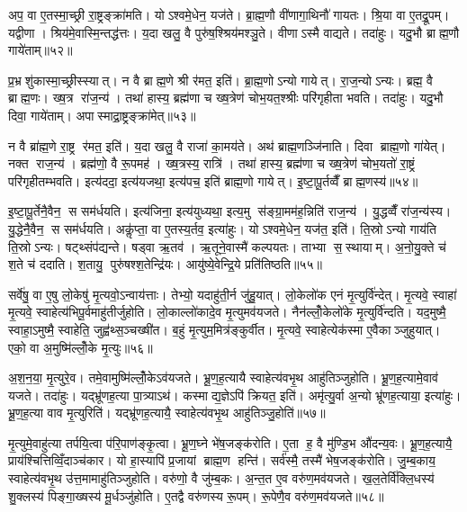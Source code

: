 अप॒ वा ए॒तस्मा॒च्छ्री रा॒ष्ट्रङ्क्रा॑मति। योऽश्वमे॒धेन॒ यज॑ते। ब्रा॒ह्म॒णौ वी॑णागा॒थिनौ॑ गायतः। श्रि॒या वा ए॒तद्रू॒पम्। यद्वीणा। श्रिय॑मे॒वास्मि॒न्तद्ध॑त्तः। य॒दा खलु॒ वै पुरु॑ष॒श्श्रिय॑मश्ञु॒ते। वीणाऽस्मै वाद्यते। तदा॑हुः। यदु॒भौ ब्राह्म॒णौ गाये॑ताम्॥५२॥

प्र॒भ्रशु॑कास्मा॒च्छ्रीस्स्यात्। न वै ब्राह्म॒णे श्री र॑मत॒ इति॑। ब्रा॒ह्म॒णोऽन्यो गायेत्। रा॒ज॒न्योऽन्यः। ब्रह्म॒ वै ब्राह्म॒णः। ख्ष॒त्र रा॑ज॒न्य॑। तथा॑ हास्य॒ ब्रह्म॑णा च ख्ष॒त्रेण॑ चोभ॒यत॒श्श्रीः परि॑गृहीता भवति। तदा॑हुः। यदु॒भौ दिवा॒ गाये॑ताम्। अपास्माद्रा॒ष्ट्रङ्क्रा॑मेत्॥५३॥

न वै ब्रा॑ह्म॒णे रा॒ष्ट्र र॑मत॒ इति॑। य॒दा खलु॒ वै राजा॑ का॒मय॑ते। अथ॑ ब्राह्म॒णञ्जि॑नाति। दिवा ब्राह्म॒णो गा॑येत्। नक्त राज॒न्य॑। ब्रह्म॑णो॒ वै रू॒पमह॑। ख्ष॒त्रस्य॒ रात्रि॑। तथा॑ हास्य॒ ब्रह्म॑णा च ख्ष॒त्रेण॑ चोभ॒यतो॑ रा॒ष्ट्रं परि॑गृहीतम्भवति। इत्य॑ददा॒ इत्य॑यजथा॒ इत्य॑पच॒ इति॑ ब्राह्म॒णो गायेत्। इ॒ष्टा॒पू॒र्तव्वैँ ब्राह्म॒णस्य॑॥५४॥

इ॒ष्टा॒पू॒र्तेनै॒वैन॒ स सम॑र्धयति। इत्य॑जिना॒ इत्य॑युध्यथा॒ इत्य॒मु स॑ङ्ग्रा॒मम॑ह॒न्निति॑ राज॒न्य॑। यु॒द्धव्वैँ रा॑ज॒न्य॑स्य। यु॒द्धेनै॒वैन॒ स सम॑र्धयति। अकॢ॑प्ता॒ वा ए॒तस्य॒र्तव॒ इत्या॑हुः। योऽश्वमे॒धेन॒ यज॑त॒ इति॑। ति॒स्रोऽन्यो गाय॑ति ति॒स्रोऽन्यः। षट्थ्संप॑द्यन्ते। षड्वा ऋ॒तव॑। ऋ॒तूने॒वास्मै॑ कल्पयतः। ताभ्या स॒स्थायाम्। अ॒नो॒यु॒क्ते च॑ श॒ते च॑ ददाति। श॒तायु॒ पुरु॑षश्श॒तेन्द्रि॑यः। आयु॑ष्ये॒वेन्द्रि॒ये प्रति॑तिष्ठति॥५५॥\anuvakamend[गाये॑ताङ्क्रामेद्ब्राह्म॒णस्य॑ कल्पयतश्च॒त्वारि॑ च]

सर्वे॑षु॒ वा ए॒षु लो॒केषु॑ मृ॒त्यवो॒ऽन्वाय॑त्ताः। तेभ्यो॒ यदाहु॑ती॒र्न जु॑हु॒यात्। लो॒केलो॑क एनं मृ॒त्युर्वि॑न्देत्। मृ॒त्यवे॒ स्वाहा॑ मृ॒त्यवे॒ स्वाहेत्य॑भिपू॒र्वमाहु॑तीर्जुहोति। लो॒काल्लो॑कादे॒व मृ॒त्युमव॑यजते। नैन॑ल्लोँ॒केलो॑के मृ॒त्युर्वि॑न्दति। यद॒मुष्मै॒ स्वाहा॒ऽमुष्मै॒ स्वाहेति॒ जुह्व॑थ्स॒ञ्चख्षी॑त। ब॒हुं मृ॒त्युम॒मित्र॑ङ्कुर्वीत। मृ॒त्यवे॒ स्वाहेत्येक॑स्मा ए॒वैकाञ्जुहुयात्। एको॒ वा अ॒मुष्मि॑ल्लोँ॒के मृ॒त्युः॥५६॥

अ॒श॒न॒या॒ मृ॒त्युरे॒व। तमे॒वामुष्मि॑ल्लोँ॒केऽव॑यजते। भ्रू॒ण॒ह॒त्यायै स्वाहेत्य॑वभृ॒थ आहु॑तिञ्जुहोति। भ्रू॒ण॒ह॒त्यामे॒वाव॑ यजते। तदा॑हुः। यद्भ्रू॑णह॒त्या पा॒त्र्याऽथ॑। कस्माद्य॒ज्ञेऽपि॑ क्रियत॒ इति॑। अमृ॑त्यु॒र्वा अ॒न्यो भ्रू॑णह॒त्याया॒ इत्या॑हुः। भ्रू॒ण॒ह॒त्या वाव मृ॒त्युरिति॑। यद्भ्रू॑णह॒त्यायै॒ स्वाहेत्य॑वभृ॒थ आहु॑तिञ्जु॒होति॑॥५७॥

मृ॒त्युमे॒वाहु॑त्या तर्पयि॒त्वा प॑रि॒पाण॑ङ्कृ॒त्वा। भ्रू॒ण॒घ्ने भे॑ष॒जङ्क॑रोति। ए॒ता ह॒ वै मु॑ण्डि॒भ औ॑दन्य॒वः। भ्रू॒ण॒ह॒त्यायै॒ प्राय॑श्चित्तिव्विँ॒दाञ्च॑कार। यो हा॒स्यापि॑ प्र॒जायां ब्राह्म॒ण हन्ति॑। सर्व॑स्मै॒ तस्मै॑ भेष॒जङ्क॑रोति। जु॒म्ब॒काय॒ स्वाहेत्य॑वभृ॒थ उ॑त्त॒मामाहु॑तिञ्जुहोति। वरु॑णो॒ वै जु॑म्ब॒कः। अ॒न्त॒त ए॒व वरु॑ण॒मव॑यजते। ख॒ल॒तेर्वि॑क्लि॒धस्य॑ शु॒क्लस्य॑ पिङ्गा॒ख्षस्य॑ मू॒र्धञ्जु॑होति। ए॒तद्वै वरु॑णस्य रू॒पम्। रू॒पेणै॒व वरु॑ण॒मव॑यजते॥५८॥\anuvakamend[लो॒के मृ॒त्युर्जु॒होति॑ मू॒र्धञ्जु॑होति॒ द्वे च॑]

